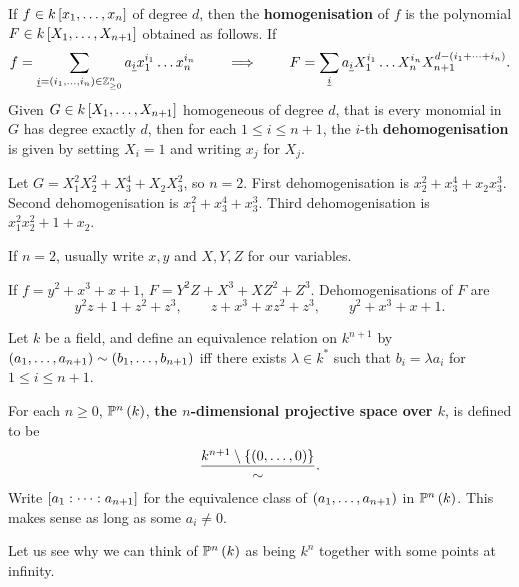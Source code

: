 \begin{definition}
If $ f \in k\sb{x_1, \dots, x_n} $ of degree $ d $, then the \textbf{homogenisation} of $ f $ is the polynomial $ F \in k\sb{X_1, \dots, X_{n + 1}} $ obtained as follows. If
$$ f = \sum_{\underline{i} = \rb{i_1, \dots, i_n} \in \Z_{\ge 0}^n} a_{\underline{i}}x_1^{i_1} \dots x_n^{i_n} \qquad \implies \qquad F = \sum_{\underline{i}} a_{\underline{i}}X_1^{i_1} \dots X_n^{i_n}X_{n + 1}^{d - \rb{i_1 + \dots + i_n}}. $$
Given $ G \in k\sb{X_1, \dots, X_{n + 1}} $ homogeneous of degree $ d $, that is every monomial in $ G $ has degree exactly $ d $, then for each $ 1 \le i \le n + 1 $, the $ i $-th \textbf{dehomogenisation} is given by setting $ X_i = 1 $ and writing $ x_j $ for $ X_j $.
\end{definition}

\begin{example*}
Let $ G = X_1^2X_2^2 + X_3^4 + X_2X_3^2 $, so $ n = 2 $. First dehomogenisation is $ x_2^2 + x_3^4 + x_2x_3^3 $. Second dehomogenisation is $ x_1^2 + x_3^4 + x_3^3 $. Third dehomogenisation is $ x_1^2x_2^2 + 1 + x_2 $.
\end{example*}

If $ n = 2 $, usually write $ x, y $ and $ X, Y, Z $ for our variables.

\begin{example*}
If $ f = y^2 + x^3 + x + 1 $, $ F = Y^2Z + X^3 + XZ^2 + Z^3 $. Dehomogenisations of $ F $ are
$$ y^2z + 1 + z^2 + z^3, \qquad z + x^3 + xz^2 + z^3, \qquad y^2 + x^3 + x + 1. $$
\end{example*}

\pagebreak

Let $ k $ be a field, and define an equivalence relation on $ k^{n + 1} $ by $ \rb{a_1, \dots, a_{n + 1}} \sim \rb{b_1, \dots, b_{n + 1}} $ iff there exists $ \lambda \in k^* $ such that $ b_i = \lambda a_i $ for $ 1 \le i \le n + 1 $.

\begin{definition}
For each $ n \ge 0 $, $ \P^n\rb{k} $, \textbf{the $ n $-dimensional projective space over $ k $}, is defined to be
$$ \dfrac{k^{n + 1} \setminus \cb{\rb{0, \dots, 0}}}{\sim}. $$
Write $ \sb{a_1 : \dots : a_{n + 1}} $ for the equivalence class of $ \rb{a_1, \dots, a_{n + 1}} $ in $ \P^n\rb{k} $. This makes sense as long as some $ a_i \ne 0 $.
\end{definition}

Let us see why we can think of $ \P^n\rb{k} $ as being $ k^n $ together with some points at infinity.

